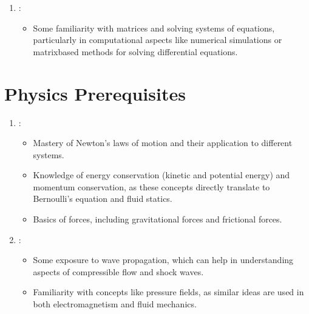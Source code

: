 \documentclass[letterpaper,10pt,english]{jupyterBook}
\begin{document}
\begin{enumerate}
\begin{itemize}
\item {} 
\sphinxAtStartPar
Line integrals, surface integrals, and volume integrals.

\item {} 
\sphinxAtStartPar
Understanding the physical meaning of the divergence theorem and Stokes’ theorem, which are crucial in fluid flow analysis using control volumes and differential analysis.

\end{itemize}

\item {} 
\sphinxAtStartPar
{}:
\begin{itemize}
\item {} 
\sphinxAtStartPar
Some familiarity with matrices and solving systems of equations, particularly in computational aspects like numerical simulations or matrix\sphinxhyphen{}based methods for solving differential equations.

\end{itemize}

\end{enumerate}


\section{Physics Prerequisites}
\label{\detokenize{prerequisites:physics-prerequisites}}\begin{enumerate}
%
\item {} 
\sphinxAtStartPar
{}:
\begin{itemize}
\item {} 
\sphinxAtStartPar
Mastery of Newton’s laws of motion and their application to different systems.

\item {} 
\sphinxAtStartPar
Knowledge of energy conservation (kinetic and potential energy) and momentum conservation, as these concepts directly translate to Bernoulli’s equation and fluid statics.

\item {} 
\sphinxAtStartPar
Basics of forces, including gravitational forces and frictional forces.

\end{itemize}

\item {} 
\sphinxAtStartPar
{}:
\begin{itemize}
\item {} 
\sphinxAtStartPar
Some exposure to wave propagation, which can help in understanding aspects of compressible flow and shock waves.

\item {} 
\sphinxAtStartPar
Familiarity with concepts like pressure fields, as similar ideas are used in both electromagnetism and fluid mechanics.

\end{itemize}

\end{enumerate}
\end{document}
